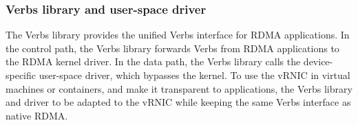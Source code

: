 \subsubsection{Verbs library and user-space driver}

The Verbs library provides the unified Verbs interface for RDMA applications. In the control path, the Verbs library forwards Verbs from RDMA applications to the RDMA kernel driver. In the data path, the Verbs library calls the device-specific user-space driver, which bypasses the kernel. To use the vRNIC in virtual machines or containers, and make it transparent to applications, the Verbs library and driver to be adapted to the vRNIC while keeping the same Verbs interface as native RDMA.


